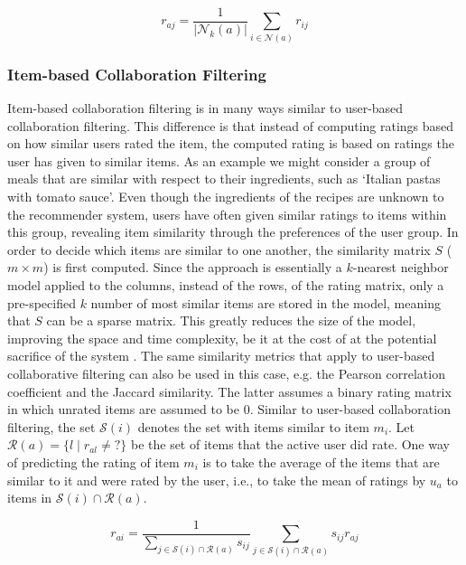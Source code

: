 \begin{equation}
	r_{aj}=\frac{1}{|\mathcal{N}_{k}(a)|}\sum_{i\in\mathcal{N}(a)}r_{ij}
\end{equation}





\subsubsection{Item-based Collaboration Filtering}
\label{subsubsec:item_based_cf}

Item-based collaboration filtering \citep{Sarwar2001} is in many ways similar to user-based collaboration filtering.
This difference is that instead of computing ratings based on how similar users rated the item, the computed rating is based on ratings the user has given to similar items.
As an example we might consider a group of meals that are similar with respect to their ingredients, such as `Italian pastas with tomato sauce'.
Even though the ingredients of the recipes are unknown to the recommender system, users have often given similar ratings to items within this group, revealing item similarity through the preferences of the user group.
In order to decide which items are similar to one another, the similarity matrix $S$ ($m \times m$) is first computed.
Since the approach is essentially a $k$-nearest neighbor model applied to the columns, instead of the rows, of the rating matrix, only a pre-specified $k$ number of most similar items are stored in the model, meaning that $S$ can be a sparse matrix.
This greatly reduces the size of the model, improving the space and time complexity, be it at the cost of at the potential sacrifice of the system \citep{Sarwar2001}.
The same similarity metrics that apply to user-based collaborative filtering can also be used in this case, e.g. the Pearson correlation coefficient and the Jaccard similarity.
The latter assumes a binary rating matrix in which unrated items are assumed to be $0$.
Similar to user-based collaboration filtering, the set $\mathcal{S}(i)$ denotes the set with items similar to item $m_i$.
Let $\mathcal{R}(a)=\{l \mid r_{al} \neq {?}\}$ be the set of items that the active user did rate.
One way of predicting the rating of item $m_i$ is to take the average of the items that are similar to it and were rated by the user, i.e., to take the mean of ratings by $u_a$ to items in $\mathcal{S}(i) \cap \mathcal{R}(a)$.

\begin{equation}
	r_{ai}=\frac{1}{\sum_{j\in{\mathcal{S}(i)\cap \mathcal{R}(a)}}s_{ij}}\sum_{j\in{\mathcal{S}(i)\cap \mathcal{R}(a)}}s_{ij}r_{aj}
\end{equation}


